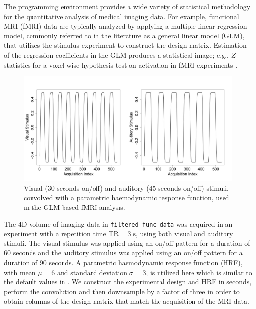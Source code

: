 \documentclass[
]{article}
\begin{document}
The  programming environment provides a wide variety of
statistical methodology for the quantitative analysis of medical imaging
data. For example, functional MRI (fMRI) data are typically analyzed by
applying a multiple linear regression model, commonly referred to in the
literature as a general linear model (GLM), that utilizes the stimulus
experiment to construct the design matrix. Estimation of the regression
coefficients in the GLM produces a statistical image; e.g.,
\(Z\)-statistics for a voxel-wise hypothesis test on activation in fMRI
experiments \citep{fri-etal:spms,fri-etal:revisited}.

\begin{figure}[tbp]
  \begin{center}
    \includegraphics*[width=\textwidth]{ffd_design.jpeg}
    \end{center}
  \caption{Visual (30 seconds on/off) and auditory (45 seconds on/off)
    stimuli, convolved with a parametric haemodynamic response
    function, used in the GLM-based fMRI analysis.}
  \label{fig:ffd-design}
\end{figure}

The 4D volume of imaging data in \texttt{filtered\_func\_data} was
acquired in an experiment with a repetition time
\(\text{TR}=3\;\text{s}\), using both visual and auditory stimuli. The
visual stimulus was applied using an on/off pattern for a duration of 60
seconds and the auditory stimulus was applied using an on/off pattern
for a duration of 90 seconds. A parametric haemodynamic response
function (HRF), with mean \(\mu=6\) and standard deviation \(\sigma=3\),
is utilized here which is similar to the default values in 
\citep{smi-etal:FSL}. We construct the experimental design and HRF in
seconds, perform the convolution and then downsample by a factor of
three in order to obtain columns of the design matrix that match the
acquisition of the MRI data.
\end{document}
